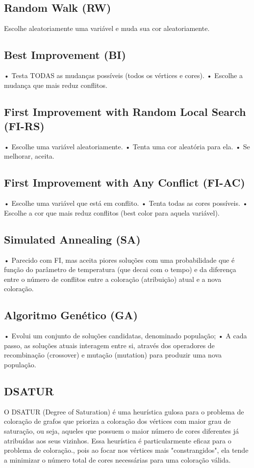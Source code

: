 \documentclass[12pt,a4paper]{article}
\begin{document}
\subsection{Random Walk (RW)}
Escolhe aleatoriamente uma variável e muda sua cor aleatoriamente.

\subsection{Best Improvement (BI)}
• Testa TODAS as mudanças possíveis (todos os vértices e cores).
• Escolhe a mudança que mais reduz conflitos.

\subsection{First Improvement with Random Local Search (FI-RS)}
• Escolhe uma variável aleatoriamente.
• Tenta uma cor aleatória para ela.
• Se melhorar, aceita.

\subsection{First Improvement with Any Conflict (FI-AC)}
• Escolhe uma variável que está em conflito.
• Tenta todas as cores possíveis.
• Escolhe a cor que mais reduz conflitos (best color para aquela variável).

\subsection{Simulated Annealing (SA)}
• Parecido com FI, mas aceita piores soluções com uma probabilidade que é
função do parâmetro de temperatura (que decai com o tempo) e da diferença
entre o número de conflitos entre a coloração (atribuição) atual e a nova
coloração.

\subsection{Algoritmo Genético (GA)}
• Evolui um conjunto de soluções candidatas, denominado população;
• A cada passo, as soluções atuais interagem entre si, através dos operadores
de recombinação (crossover) e mutação (mutation) para produzir uma nova
população.

\subsection{DSATUR}

O DSATUR (Degree of Saturation) é uma heurística gulosa para o problema de coloração de grafos que prioriza a coloração dos vértices com maior grau de saturação, ou seja, aqueles que possuem o maior número de cores diferentes já atribuídas aos seus vizinhos. Essa heurística é particularmente eficaz para o problema de coloração., pois ao focar nos vértices mais "constrangidos", ela tende a minimizar o número total de cores necessárias para uma coloração válida.
\end{document}
